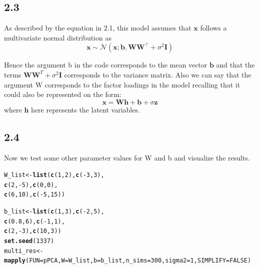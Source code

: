\documentclass[10pt, a4paper, english]{article}\usepackage[]{graphicx}\usepackage[dvipsnames]{xcolor}
\makeatletter
\newcommand{\hlnum}[1]{\textcolor[rgb]{0.686,0.059,0.569}{#1}}%
\newcommand{\hlopt}[1]{\textcolor[rgb]{0,0,0}{#1}}%
\newcommand{\hlstd}[1]{\textcolor[rgb]{0.345,0.345,0.345}{#1}}%
\newcommand{\hlkwb}[1]{\textcolor[rgb]{0.69,0.353,0.396}{#1}}%
\newcommand{\hlkwc}[1]{\textcolor[rgb]{0.333,0.667,0.333}{#1}}%
\newcommand{\hlkwd}[1]{\textcolor[rgb]{0.737,0.353,0.396}{\textbf{#1}}}%
\newenvironment{kframe}{%
 \def\at@end@of@kframe{}%
 \ifinner\ifhmode%
  \def\at@end@of@kframe{\end{minipage}}%
  \begin{minipage}{\columnwidth}%
 \fi\fi%
 \def\FrameCommand##1{\hskip\@totalleftmargin \hskip-\fboxsep
 \colorbox{shadecolor}{##1}\hskip-\fboxsep
     \hskip-\linewidth \hskip-\@totalleftmargin \hskip\columnwidth}%
 \MakeFramed {\advance\hsize-\width
   \@totalleftmargin\z@ \linewidth\hsize
   \@setminipage}}%
 {\par\unskip\endMakeFramed%
 \at@end@of@kframe}
\newenvironment{knitrout}{}{} %
\makeatother
\begin{document}
\subsection{2.3}
As described by the equation in 2.1, this model assumes that $\bm{x}$ follows a multivariate normal distribution as $$\mathbf{x} \sim \mathcal{N}\left(\boldsymbol{x} ; \boldsymbol{b}, \boldsymbol{W} \boldsymbol{W}^{\top}+\sigma^2 \boldsymbol{I}\right)$$

Hence the argument b in the code corresponds to the mean vector $\bm{b}$ and that the terms $\bm{WW}^T + \sigma^2\bm{I}$ corresponds to the variance matrix. Also we can say that the argument W corresponds to the factor loadings in the model recalling that it could also be represented on the form:
$$
\mathbf{x}=\boldsymbol{W} \mathbf{h}+\boldsymbol{b}+\sigma \mathbf{z}
$$ where $\bm{h}$ here represents the latent variables. 

\subsection{2.4}
Now we test some other parameter values for W and b and visualize the results.

\begin{knitrout}
\color{fgcolor}\begin{kframe}
\begin{alltt}
\hlstd{W_list} \hlkwb{<-} \hlkwd{list}\hlstd{(}\hlkwd{c}\hlstd{(}\hlnum{1}\hlstd{,}\hlnum{2}\hlstd{),} \hlkwd{c}\hlstd{(}\hlopt{-}\hlnum{3}\hlstd{,}\hlnum{3}\hlstd{),}
               \hlkwd{c}\hlstd{(}\hlnum{2}\hlstd{,}\hlopt{-}\hlnum{5}\hlstd{),} \hlkwd{c}\hlstd{(}\hlnum{0}\hlstd{,}\hlnum{0}\hlstd{),}
               \hlkwd{c}\hlstd{(}\hlnum{6}\hlstd{,}\hlnum{10}\hlstd{),} \hlkwd{c}\hlstd{(}\hlopt{-}\hlnum{5}\hlstd{,}\hlnum{15}\hlstd{))}

\hlstd{b_list} \hlkwb{<-} \hlkwd{list}\hlstd{(}\hlkwd{c}\hlstd{(}\hlnum{1}\hlstd{,}\hlnum{3}\hlstd{),} \hlkwd{c}\hlstd{(}\hlopt{-}\hlnum{2}\hlstd{,}\hlnum{5}\hlstd{),}
               \hlkwd{c}\hlstd{(}\hlnum{0.8}\hlstd{,} \hlnum{6}\hlstd{),} \hlkwd{c}\hlstd{(}\hlopt{-}\hlnum{1}\hlstd{,} \hlnum{1}\hlstd{),}
               \hlkwd{c}\hlstd{(}\hlnum{2}\hlstd{,} \hlopt{-}\hlnum{3}\hlstd{),} \hlkwd{c}\hlstd{(}\hlnum{10}\hlstd{,} \hlnum{3}\hlstd{))}
\hlkwd{set.seed}\hlstd{(}\hlnum{1337}\hlstd{)}
\hlstd{multi_res} \hlkwb{<-} \hlkwd{mapply}\hlstd{(}\hlkwc{FUN}\hlstd{=pPCA,} \hlkwc{W}\hlstd{=W_list,} \hlkwc{b}\hlstd{=b_list,} \hlkwc{n_sims}\hlstd{=}\hlnum{300}\hlstd{,} \hlkwc{sigma2}\hlstd{=}\hlnum{1}\hlstd{,} \hlkwc{SIMPLIFY} \hlstd{=} \hlnum{FALSE}\hlstd{)}
\end{alltt}
\end{kframe}
\end{knitrout}
\end{document}
